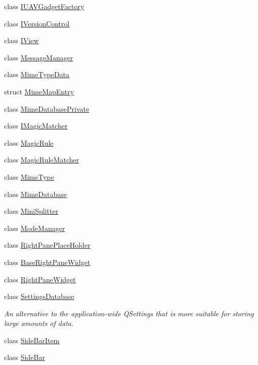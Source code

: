 \begin{DoxyCompactItemize}
\item 
class \hyperlink{class_core_1_1_i_u_a_v_gadget_factory}{\-I\-U\-A\-V\-Gadget\-Factory}
\item 
class \hyperlink{class_core_1_1_i_version_control}{\-I\-Version\-Control}
\item 
class \hyperlink{class_core_1_1_i_view}{\-I\-View}
\item 
class \hyperlink{class_core_1_1_message_manager}{\-Message\-Manager}
\item 
class \hyperlink{class_core_1_1_mime_type_data}{\-Mime\-Type\-Data}
\item 
struct \hyperlink{struct_core_1_1_mime_map_entry}{\-Mime\-Map\-Entry}
\item 
class \hyperlink{class_core_1_1_mime_database_private}{\-Mime\-Database\-Private}
\item 
class \hyperlink{class_core_1_1_i_magic_matcher}{\-I\-Magic\-Matcher}
\item 
class \hyperlink{class_core_1_1_magic_rule}{\-Magic\-Rule}
\item 
class \hyperlink{class_core_1_1_magic_rule_matcher}{\-Magic\-Rule\-Matcher}
\item 
class \hyperlink{class_core_1_1_mime_type}{\-Mime\-Type}
\item 
class \hyperlink{class_core_1_1_mime_database}{\-Mime\-Database}
\item 
class \hyperlink{class_core_1_1_mini_splitter}{\-Mini\-Splitter}
\item 
class \hyperlink{class_core_1_1_mode_manager}{\-Mode\-Manager}
\item 
class \hyperlink{class_core_1_1_right_pane_place_holder}{\-Right\-Pane\-Place\-Holder}
\item 
class \hyperlink{class_core_1_1_base_right_pane_widget}{\-Base\-Right\-Pane\-Widget}
\item 
class \hyperlink{class_core_1_1_right_pane_widget}{\-Right\-Pane\-Widget}
\item 
class \hyperlink{class_core_1_1_settings_database}{\-Settings\-Database}
\begin{DoxyCompactList}\small\item\em \-An alternative to the application-\/wide \-Q\-Settings that is more suitable for storing large amounts of data. \end{DoxyCompactList}\item 
class \hyperlink{class_core_1_1_side_bar_item}{\-Side\-Bar\-Item}
\item 
class \hyperlink{class_core_1_1_side_bar}{\-Side\-Bar}

\end{DoxyCompactItemize}
